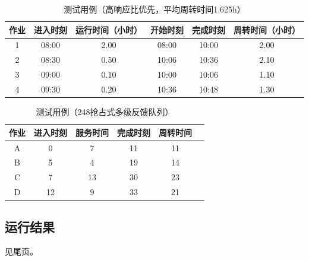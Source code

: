 \documentclass[12pt, a4paper, UTF8]{ctexart}
\begin{document}
\begin{table}[htbp]
    \caption{测试用例（高响应比优先，平均周转时间1.625h）}
    \centering
    \begin{tabular}{cccccc}
        \toprule
        作业 & 进入时刻 & 运行时间（小时） & 开始时刻 & 完成时刻 & 周转时间（小时） \\
        \midrule
        1    & 08:00    & 2.00             & 08:00    & 10:00    & 2.00             \\
        2    & 08:30    & 0.50             & 10:06    & 10:36    & 2.10             \\
        3    & 09:00    & 0.10             & 10:00    & 10:06    & 1.10             \\
        4    & 09:30    & 0.20             & 10:36    & 10:48    & 1.30             \\
        \bottomrule
    \end{tabular}
    \qquad
\end{table}

\begin{table}[htbp]
    \caption{测试用例（248抢占式多级反馈队列）}
    \centering
    \begin{tabular}{cccccc}
        \toprule
        作业 & 进入时刻 & 服务时间 & 完成时刻 & 周转时间 \\
        \midrule
        A    & 0        & 7        & 11       & 11       \\
        B    & 5        & 4        & 19       & 14       \\
        C    & 7        & 13       & 30       & 23       \\
        D    & 12       & 9        & 33       & 21       \\
        \bottomrule
    \end{tabular}
    \qquad
\end{table}

\subsection{运行结果}
见尾页。
\end{document}
